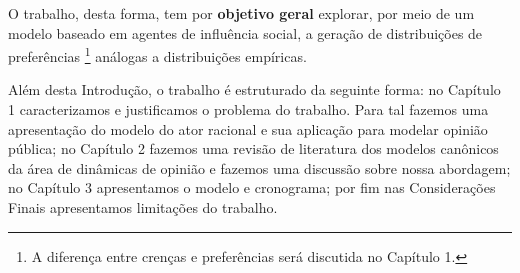 O trabalho, desta forma, tem por \textbf{objetivo geral} explorar, por meio
de um modelo baseado em agentes de influência social, a geração de distribuições
de preferências \footnote{A diferença entre crenças e preferências será
discutida no Capítulo 1.} análogas a distribuições empíricas.

Além desta Introdução, o trabalho é estruturado da seguinte forma: no Capítulo 1
caracterizamos e justificamos o problema do trabalho. Para tal fazemos uma
apresentação do modelo do ator racional e sua aplicação para modelar opinião
pública; no Capítulo 2 fazemos uma revisão de literatura dos modelos canônicos
da área de dinâmicas de opinião e fazemos uma discussão sobre nossa abordagem;
no Capítulo 3 apresentamos o modelo e cronograma; por fim nas
Considerações Finais apresentamos limitações do trabalho.








